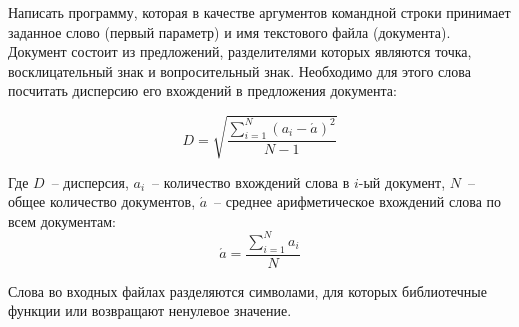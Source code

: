 
Написать программу, которая в качестве аргументов командной строки
принимает заданное слово (первый параметр) и имя текстового файла
(документа). Документ состоит из предложений, разделителями которых
являются точка, восклицательный знак и вопросительный знак.
Необходимо для этого слова посчитать дисперсию его вхождений в
предложения документа:

$$
	D=\sqrt{ \frac{ \sum^N_{i = 1}{ (a_i-\acute{a})^2 } }{ N - 1 } }
$$

Где $D$~-- дисперсия, $a_i$~-- количество вхождений слова в $i$-ый документ, $N$~-- общее количество документов,
$\acute{a}$~-- среднее арифметическое вхождений слова по всем документам:
$$
	\acute{a} = \frac{ \sum^N_{i=1}{a_i} }{N}
$$

Слова во входных файлах разделяются символами, для которых
библиотечные функции  или  возвращают ненулевое
значение.
